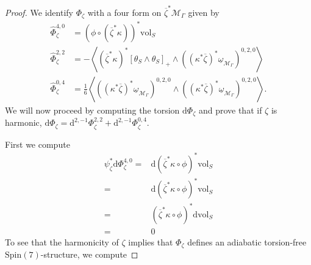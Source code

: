 \documentclass[psamsfonts]{amsart}
\theoremstyle{plain}
\theoremstyle{definition}{
\newtheorem{defi}{Definition}[section]
\newtheorem{ass}{Assumption}
\newtheorem*{nota}{Notation}}
\theoremstyle{remark}{
\newtheorem{rem}{Remark}
\newtheorem{ex}{Example}}
\theoremstyle{plain}{
\newtheorem{thm}{Theorem}[section]
\newtheorem{lem}{Lemma}[section]
\newtheorem{cor}{Corollary}[section]
\newtheorem{prop}{Proposition}[section]
\newtheorem{con}{Conjecture}[section]}
\newcommand{\m}[1]{{\mathrm{#1}}}
\begin{document}
\begin{proof}
We identify $\Phi_\zeta$ with a four form on $\overline{\zeta}^*\mathcal{M}_\Gamma$ given by 
\begin{align*}
    \hat{\Phi}_\zeta^{4,0}&=(\phi\circ(\overline{\zeta}^*\kappa))^*\m{vol}_S\\
    \hat{\Phi}_\zeta^{2,2}&=-\left<(\overline{\zeta}^*\kappa)^*\left[\theta_{S}\wedge\theta_S\right]_+\wedge((\kappa^*\overline{\zeta})^*\underline{\omega}_{\mathcal{M}_\Gamma})^{0,2,0}\right>\\
    \hat{\Phi}_\zeta^{0,4}&=\frac{1}{6}\left<((\kappa^*\overline{\zeta})^*\underline{\omega}_{\mathcal{M}_\Gamma})^{0,2,0}\wedge((\kappa^*\overline{\zeta})^*\underline{\omega}_{\mathcal{M}_\Gamma})^{0,2,0}\right>.
\end{align*}
We will now proceed by computing the torsion $\m{d}\Phi_\zeta$ and prove that if $\zeta$ is harmonic, $\m{d}\Phi_\zeta=\m{d}^{2,-1}\Phi^{2,2}_\zeta+\m{d}^{2,-1}\Phi^{0,4}_\zeta$.

First we compute
\begin{align*}
    \psi_\zeta^*\m{d}\Phi_\zeta^{4,0}=&\m{d}(\overline{\zeta}^*\kappa\circ\phi)^*\m{vol}_S\\
    =&\m{d}(\overline{\zeta}^*\kappa\circ\phi)^*\m{vol}_S\\
    =&(\overline{\zeta}^*\kappa\circ\phi)^*\m{d}\m{vol}_S\\
    =&0
\end{align*}
To see that the harmonicity of $\zeta$ implies that $\Phi_\zeta$ defines an adiabatic torsion-free $\m{Spin}(7)$-structure, we compute


\end{proof}
\end{document}
